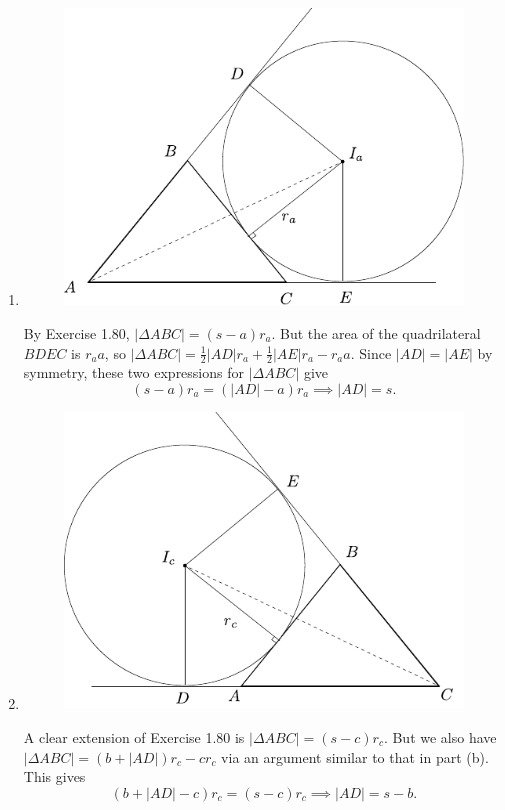 \documentclass[twoside,10pt]{article}
\begin{document}
\begin{enumerate}
	\item 
		\begin{figure}[H]
			\centering
			\includegraphics[scale=1]{fig/81b.pdf}
		\end{figure}
		By Exercise 1.80, $|\Delta ABC| = (s-a)r_{a}$. But the area of the quadrilateral $BDEC$ is $r_a a$, so $|\Delta ABC|=\frac{1}{2} |AD|r_{a} + \frac{1}{2} |AE|r_{a}-r_{a}a$. Since $|AD|=|AE|$ by symmetry, these two expressions for $|\Delta ABC|$ give
		\[
			(s-a)r_{a} = (|AD|-a)r_{a} \implies |AD|=s.
		\] 
	\item 
		\begin{figure}[H]
			\centering
			\includegraphics[scale=1]{fig/81c.pdf}
		\end{figure}
		A clear extension of Exercise 1.80 is $|\Delta ABC| = (s-c)r_{c}$. But we also have $|\Delta ABC| = (b+|AD|)r_{c} - cr_{c}$ via an argument similar to that in part (b). This gives
		\[
			(b+|AD|-c)r_{c} = (s-c)r_{c} \implies |AD| = s-b.
		\] 
\end{enumerate}
\end{document}

